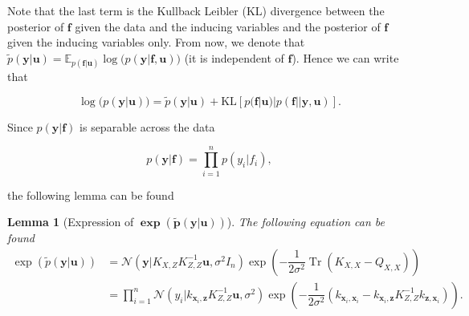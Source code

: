 \documentclass[12pt,a4paper,oneside]{book}
\newtheorem{Lemma}{Lemma}
\DeclareMathOperator{\Tr}{Tr}
\begin{document}
Note that the last term is the Kullback Leibler (KL) divergence between the posterior of $\bm{f}$ given the data and the
inducing variables and the posterior of $\bm{f}$ given the inducing variables only. From now, we denote that $ \tilde{p}(\bm{y}|\bm{u}) = \mathbb{E}_{p(\bm{f}|\bm{u})}\log{(p(\bm{y}|\bm{f}, \bm{u})})$ (it is independent of $\bm{f}$). Hence we can write that 

\begin{equation}\label{sparse_var_5}
\log{(p(\bm{y}|\bm{u})}) = \tilde{p}(\bm{y}|\bm{u}) + \text{KL}[p(\bm{f}|\bm{u})|p(\bm{f}||\bm{y},\bm{u})].
\end{equation}

Since $p(\bm{y}|\bm{f})$ is separable across the data

\begin{equation}
p(\bm{y}|\bm{f}) = \prod_{i=1}^{n} p(y_i|f_i),
\end{equation}


the following lemma can be found

\begin{Lemma}[Expression of $\bm{\exp (\tilde{p}(\bm{y}|\bm{u}) )}$]\label{lemma_bound1}
The following equation can be found 
\begin{align}\label{sparse_var_2}
\exp (\tilde{p}(\bm{y}|\bm{u}) )&= \mathcal{N} (\bm{y}|K_{X,Z} K^{-1}_{Z,Z} \bm{u}, \sigma^2 I_n ) \exp{ \left( -\dfrac{1}{2\sigma^2} \Tr ( K_{X,X} - Q_{X,X} ) \right)} \nonumber \\
&= \prod_{i=1}^n \mathcal{N}(y_i|k_{\bm{x}_i,\bm{z}} K^{-1}_{Z,Z} \bm{u} , \sigma^2) \exp{\left(-\dfrac{1}{2\sigma^2}(k_{\bm{x}_i,\bm{x}_i} - k_{\bm{x}_i,\bm{z}} K^{-1}_{Z,Z}k_{\bm{z},\bm{x}_i}) \right)} .
\end{align}
\end{Lemma}
\end{document}
